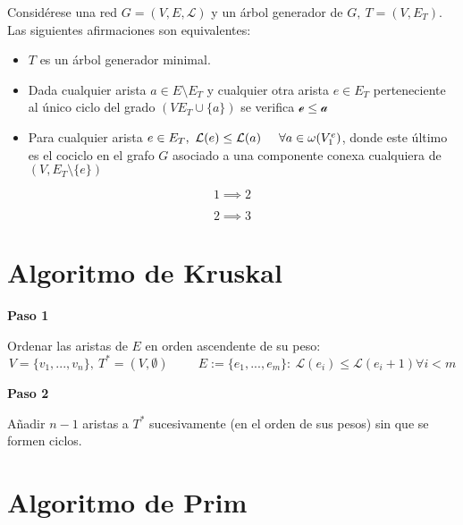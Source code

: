 \documentclass[openany]{book}
\begin{document}
\begin{proposition}
  Considérese una red $G= (V,E, \mathcal{L})$ y un árbol generador de $ G, \ T=(V, E_T) $. Las siguientes afirmaciones son equivalentes:

  \begin{itemize}
    \item $ T $ es un árbol generador minimal.
    \item Dada cualquier arista $a \in E \setminus E_T$ y cualquier otra arista $ e \in E_T $ perteneciente al único ciclo del grado $(V E_T \cup \{ a \}) $ se verifica $ \mathcal{e} \leq \mathcal{a} $
    \item Para cualquier arista $ e \in E_T, \ \mathcal{L}(e) \leq \mathcal{L}(a) \hspace{0.5cm} \forall a \in \omega (V_1^e) $, donde este último es el cociclo en el grafo $G$ asociado a una componente conexa cualquiera de $(V, E_T \setminus \{ e \})$
  \end{itemize}
\end{proposition}
\begin{demonstration}
  $$ 1 \implies 2 $$


  $$ 2 \implies 3 $$
\end{demonstration}




\section{Algoritmo de Kruskal}

\begin{center}
  \textbf{Paso 1}
\end{center}

    Ordenar las aristas de $ E $ en orden ascendente de su peso:
    $$ V = \{v_1,...,v_n\},\ T^* = (V, \emptyset) \hspace{1cm} E := \{e_1,...,e_m\}:\ \mathcal{L}(e_i) \leq \mathcal{L}(e_i+1) \forall i < m $$

    \begin{center}
      \textbf{Paso 2}
    \end{center}

    Añadir $ n-1 $ aristas a $ T^* $ sucesivamente (en el orden de sus pesos) sin que se formen ciclos.

    \section{Algoritmo de Prim}
\end{document}
